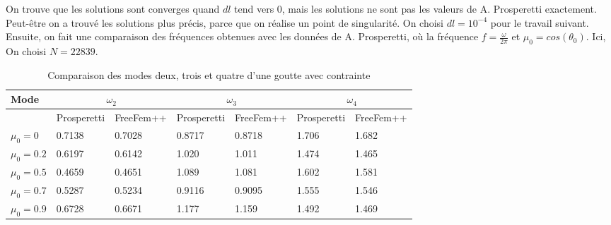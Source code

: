 \documentclass[a4paper]{report}
\begin{document}
On trouve que les solutions sont converges quand $dl$ tend vers 0, mais les solutions ne sont pas les valeurs de A. Prosperetti exactement. Peut-être on a trouvé les solutions plus précis, parce que on réalise un point de singularité. On choisi $dl = 10^{-4}$ pour le travail suivant.
\newpage
Ensuite, on fait une comparaison des fréquences obtenues avec les données de A. Prosperetti, où la fréquence $f = \frac{\omega}{2\pi}$ et $\mu_0 = cos(\theta_0)$. Ici, On choisi $N = 22839$.
\begin{table}[htp]
\begin{center}
    \begin{tabular}{ | l || l | l || l | l || l | l || }
    \hline
    Mode          &\multicolumn{2}{c||}{$\omega_2$} & \multicolumn{2}{c||}{$\omega_3$} & \multicolumn{2}{c||}{$\omega_4$} \\
    \hline
                  & Prosperetti & FreeFem++ & Prosperetti & FreeFem++ & Prosperetti & FreeFem++ \\
    \hline
    $\mu_0 = 0$    & 0.7138      & 0.7028    & 0.8717      & 0.8718    & 1.706       & 1.682 \\
    \hline
    $\mu_0 = 0.2$  & 0.6197      & 0.6142    & 1.020       & 1.011     & 1.474       & 1.465 \\
    \hline
    $\mu_0 = 0.5$  & 0.4659      & 0.4651    & 1.089       & 1.081     & 1.602       & 1.581 \\
    \hline
    $\mu_0 = 0.7$  & 0.5287      & 0.5234    & 0.9116      & 0.9095    & 1.555       & 1.546 \\
    \hline
    $\mu_0 = 0.9$  & 0.6728      & 0.6671    & 1.177       & 1.159     & 1.492       & 1.469 \\
    \hline
    \end{tabular}
\end{center}
\caption{Comparaison des modes deux, trois et quatre d'une goutte avec contrainte}
\end{table}
\end{document}
